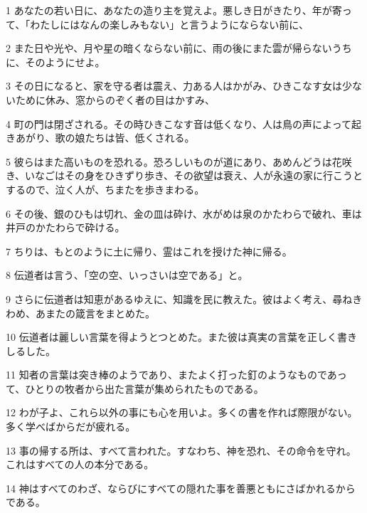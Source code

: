 \par 1 あなたの若い日に、あなたの造り主を覚えよ。悪しき日がきたり、年が寄って、「わたしにはなんの楽しみもない」と言うようにならない前に、
\par 2 また日や光や、月や星の暗くならない前に、雨の後にまた雲が帰らないうちに、そのようにせよ。
\par 3 その日になると、家を守る者は震え、力ある人はかがみ、ひきこなす女は少ないために休み、窓からのぞく者の目はかすみ、
\par 4 町の門は閉ざされる。その時ひきこなす音は低くなり、人は鳥の声によって起きあがり、歌の娘たちは皆、低くされる。
\par 5 彼らはまた高いものを恐れる。恐ろしいものが道にあり、あめんどうは花咲き、いなごはその身をひきずり歩き、その欲望は衰え、人が永遠の家に行こうとするので、泣く人が、ちまたを歩きまわる。
\par 6 その後、銀のひもは切れ、金の皿は砕け、水がめは泉のかたわらで破れ、車は井戸のかたわらで砕ける。
\par 7 ちりは、もとのように土に帰り、霊はこれを授けた神に帰る。
\par 8 伝道者は言う、「空の空、いっさいは空である」と。
\par 9 さらに伝道者は知恵があるゆえに、知識を民に教えた。彼はよく考え、尋ねきわめ、あまたの箴言をまとめた。
\par 10 伝道者は麗しい言葉を得ようとつとめた。また彼は真実の言葉を正しく書きしるした。
\par 11 知者の言葉は突き棒のようであり、またよく打った釘のようなものであって、ひとりの牧者から出た言葉が集められたものである。
\par 12 わが子よ、これら以外の事にも心を用いよ。多くの書を作れば際限がない。多く学べばからだが疲れる。
\par 13 事の帰する所は、すべて言われた。すなわち、神を恐れ、その命令を守れ。これはすべての人の本分である。
\par 14 神はすべてのわざ、ならびにすべての隠れた事を善悪ともにさばかれるからである。


